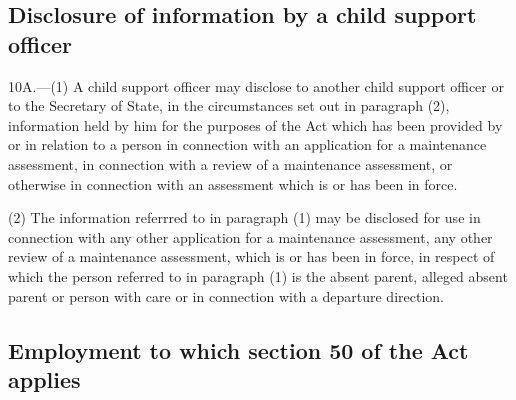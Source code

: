 \documentclass[a4paper,12pt]{article}
\begin{document}

\subsection[10A. Disclosure of information by a child support officer]{Disclosure of information by a child support officer}

10A.—(1) A child support officer may disclose to another child support officer or to the Secretary of State, in the circumstances set out in paragraph (2), information held by him for the purposes of the Act which has been provided by or in relation to a person in connection with an application for a maintenance assessment, in connection with a review of a maintenance assessment, or otherwise in connection with an assessment which is or has been in force.

(2) The information referrred to in paragraph (1) may be disclosed for use in connection with any other application for a maintenance assessment, 
any other review of a maintenance assessment, which is or has been in force, in respect of which the person referred to in paragraph (1) is the absent parent, alleged absent parent or person with care
or in connection with a departure direction.  %


\subsection[11. Employment to which section 50 of the Act applies]{Employment to which section 50 of the Act applies}
\end{document}
